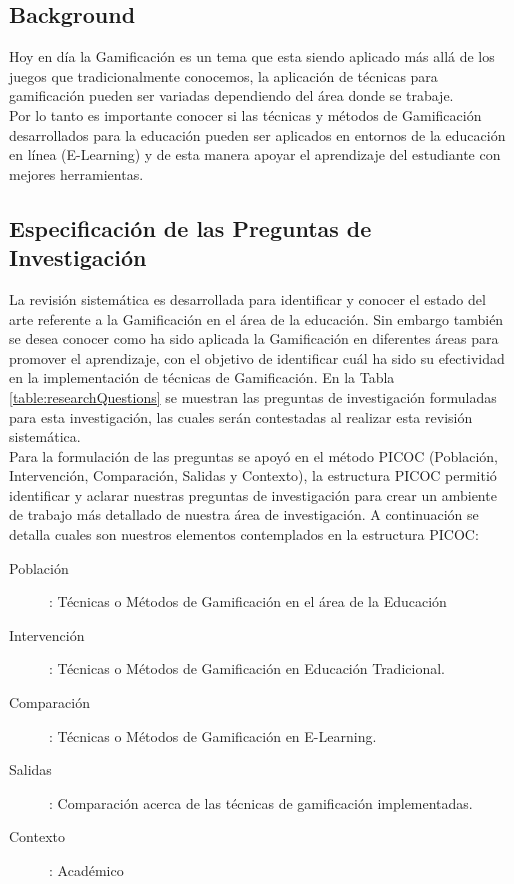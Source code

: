 \documentclass{report}
\begin{document}
	\subsection{Background}\label{back}
        Hoy en día la Gamificación es un tema que esta siendo aplicado más allá de los juegos que tradicionalmente conocemos, la aplicación de técnicas para gamificación pueden ser variadas dependiendo del área donde se trabaje. \\
        Por lo tanto es importante conocer si las técnicas y métodos de Gamificación desarrollados para la educación pueden ser aplicados en entornos de la educación en línea (E-Learning) y de esta manera apoyar el aprendizaje del estudiante con mejores herramientas.
                
    	    \subsection{Especificación de las Preguntas de Investigación}
            La revisión sistemática es desarrollada para identificar y conocer el estado del arte referente a la Gamificación en el área de la educación. Sin embargo también se desea conocer como ha sido aplicada la Gamificación en diferentes áreas para promover el aprendizaje, con el objetivo de identificar cuál ha sido su efectividad en la implementación de técnicas de Gamificación. En la Tabla \ref{table:researchQuestions} se muestran las preguntas de investigación formuladas para esta investigación, las cuales serán contestadas al realizar esta revisión sistemática.\\
            Para la formulación de las preguntas se apoyó en el método PICOC (Población, Intervención, Comparación, Salidas y Contexto), la estructura PICOC permitió identificar y aclarar nuestras preguntas de investigación para crear un ambiente de trabajo más detallado de nuestra área de investigación. A continuación se detalla cuales son nuestros elementos contemplados en la estructura PICOC:\\
            \begin{description}
                \item[Población]: Técnicas o Métodos de Gamificación en el área de la Educación
                \item[Intervención]: Técnicas o Métodos de Gamificación en Educación Tradicional.
                \item[Comparación]: Técnicas o Métodos de Gamificación en E-Learning.
                \item[Salidas]: Comparación acerca de las técnicas de gamificación implementadas.
                \item[Contexto]: Académico
            \end{description}
\end{document}
